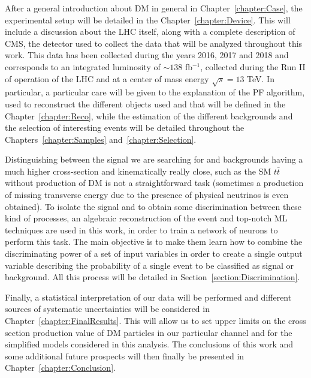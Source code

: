 \documentclass[a4paper, 10pt, openright]{report}
\begin{document}
After a general introduction about \ac{DM} in general in Chapter~\ref{chapter:Case}, the experimental setup will be detailed in the Chapter~\ref{chapter:Device}. This will include a discussion about the \ac{LHC} itself, along with a complete description of \ac{CMS}, the detector used to collect the data that will be analyzed throughout this work. This data has been collected during the years 2016, 2017 and 2018 and corresponds to an integrated luminosity of $\sim 138$ fb$^{-1}$, collected during the Run II of operation of the \ac{LHC} and at a center of mass energy $\sqrt{s} = 13$ TeV. In particular, a particular care will be given to the explanation of the \ac{PF} algorithm, used to reconstruct the different objects used and that will be defined in the Chapter~\ref{chapter:Reco}, while the estimation of the different backgrounds and the selection of interesting events will be detailed throughout the Chapters~\ref{chapter:Samples} and~\ref{chapter:Selection}.

Distinguishing between the signal we are searching for and backgrounds having a much higher cross-section and kinematically really close, such as the \ac{SM} $t \bar t$ without production of \ac{DM} is not a straightforward task (sometimes a production of missing transverse energy due to the presence of physical neutrinos is even obtained). To isolate the signal and to obtain some discrimination between these kind of processes, an algebraic reconstruction of the event and top-notch \ac{ML} techniques are used in this work, in order to train a network of neurons to perform this task. The main objective is to make them learn how to combine the discriminating power of a set of input variables in order to create a single output variable describing the probability of a single event to be classified as signal or background. All this process will be detailed in Section~\ref{section:Discrimination}.

Finally, a statistical interpretation of our data will be performed and different sources of systematic uncertainties will be considered in Chapter~\ref{chapter:FinalResults}. This will allow us to set upper limits on the cross section production value of \ac{DM} particles in our particular channel and for the simplified models considered in this analysis. The conclusions of this work and some additional future prospects will then finally be presented in Chapter~\ref{chapter:Conclusion}.
\\


\end{document}
